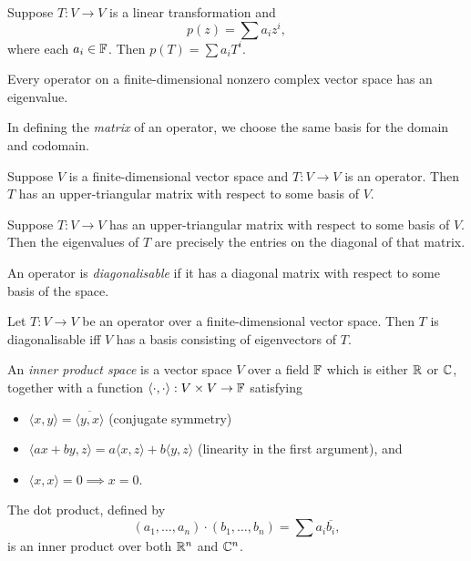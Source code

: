 \begin{defn}
  Suppose $T:V\to V$ is a linear transformation and
  \[p(z)=\sum a_i z^i,\] where each $a_i\in\mathbb{F}$. Then $p(T)=\sum a_i T^i$.
\end{defn}
\begin{thm}
  Every operator on a finite-dimensional nonzero complex vector space has an
  eigenvalue.
\end{thm}
\begin{defn}
  In defining the \emph{matrix} of an operator, we choose the same basis for the
  domain and codomain.
\end{defn}
\begin{prop}
  Suppose $V$ is a finite-dimensional vector space and $T:V\to V$ is an
  operator. Then $T$ has an upper-triangular matrix with respect to some basis
  of $V$.
\end{prop}
\begin{prop}
  Suppose $T:V\to V$ has an upper-triangular matrix with respect to some basis
  of $V$. Then the eigenvalues of $T$ are precisely the entries on the diagonal
  of that matrix.
\end{prop}
\begin{defn}
  An operator is \emph{diagonalisable} if it has a diagonal
  matrix with respect to some basis of the space.
\end{defn}
\begin{prop}
  Let $T:V\to V$ be an operator over a finite-dimensional vector space.
  Then $T$ is diagonalisable iff $V$ has a basis
  consisting of eigenvectors of $T$.
\end{prop}
\begin{defn}
  An \emph{inner product space} is a vector space $V$ over a field $\mathbb{F}$ which
  is either $\mathbb{R}$ or $\mathbb{C}$, together with a function
  $\langle\cdot,\cdot\rangle:V\times V\to\mathbb{F}$ satisfying
  \begin{itemize}
    \item $\langle  x, y\rangle=\overline{\langle 
      y, x\rangle}$ (conjugate
      symmetry)
    \item $\langle a x+b y, z\rangle=a\langle
      x, z\rangle+b\langle y, z\rangle$ (linearity in the
      first argument), and
    \item $\langle x, x\rangle=0\implies x= 0$.
  \end{itemize}
\end{defn}
\begin{prop}
  The dot product, defined by 
  \[(a_1,\ldots,a_n)\cdot(b_1,\ldots,b_n)=\sum a_i\overline{b_i},\]
  is an inner product over both $\mathbb{R}^n$ and $\mathbb{C}^n$.
\end{prop}
